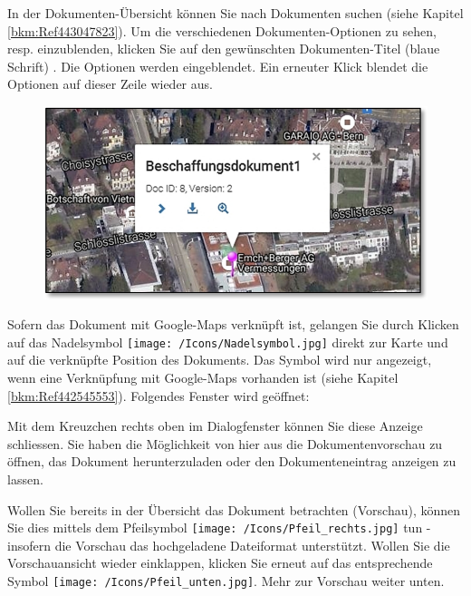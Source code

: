 \vspace{-7pt}
In der Dokumenten-Übersicht können Sie nach Dokumenten suchen (siehe Kapitel \ref{bkm:Ref443047823}). Um die verschiedenen Dokumenten-Optionen zu sehen, resp. einzublenden, klicken Sie auf den gewünschten Dokumenten-Titel (blaue Schrift) . Die Optionen werden eingeblendet. Ein erneuter Klick blendet die Optionen auf dieser Zeile wieder aus. \newline

\begin{figure}
  \vspace{-0pt} 
  \begin{center}
    \includegraphics[width=1\linewidth]{../chapters/11_Dokumentenablage/pictures/11-2-4_DokAufGoogleMaps.jpg}
  \end{center}
  \vspace{-20pt}
  \vspace{-10pt}
\end{figure}
Sofern das Dokument mit Google-Maps verknüpft ist, gelangen Sie durch Klicken auf das Nadelsymbol \texttt{[image: /Icons/Nadelsymbol.jpg]}  direkt zur Karte und auf die verknüpfte Position des Dokuments. Das Symbol wird nur angezeigt, wenn eine Verknüpfung mit Google-Maps vorhanden ist (siehe Kapitel \ref{bkm:Ref442545553}). Folgendes Fenster wird geöffnet:

\vspace{\baselineskip}

Mit dem Kreuzchen rechts oben im Dialogfenster können Sie diese Anzeige schliessen. Sie haben die Möglichkeit von hier aus die Dokumentenvorschau zu öffnen, das Dokument herunterzuladen oder den Dokumenteneintrag anzeigen zu lassen. \newline

Wollen Sie bereits in der Übersicht das Dokument betrachten (Vorschau), können Sie dies mittels dem Pfeilsymbol \texttt{[image: /Icons/Pfeil\_rechts.jpg]}  tun - insofern die Vorschau das hochgeladene Dateiformat unterstützt. Wollen Sie die Vorschauansicht wieder einklappen, klicken Sie erneut auf das entsprechende Symbol \texttt{[image: /Icons/Pfeil\_unten.jpg]}. Mehr zur Vorschau weiter unten. \newline

